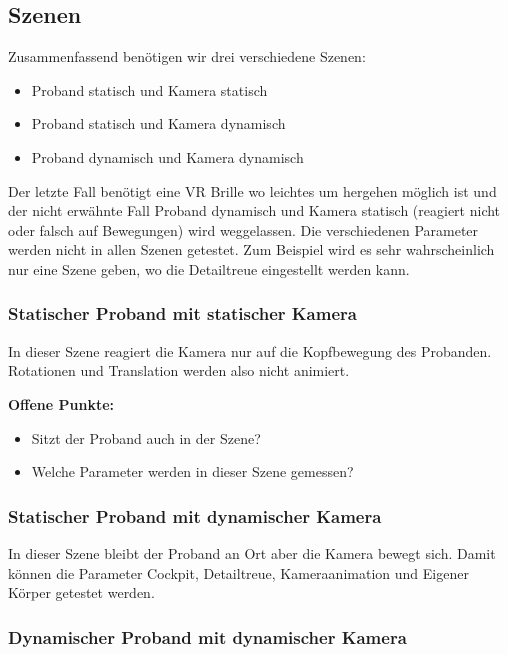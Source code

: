 \clearpage

\subsection{Szenen}


Zusammenfassend benötigen wir drei verschiedene Szenen:

\begin{itemize}
	\item Proband statisch und Kamera statisch
	\item Proband statisch und Kamera dynamisch
	\item Proband dynamisch und Kamera dynamisch
\end{itemize}

Der letzte Fall benötigt eine VR Brille wo leichtes um hergehen möglich ist und der nicht erwähnte Fall Proband dynamisch und Kamera statisch (reagiert nicht oder falsch auf Bewegungen) wird weggelassen.
Die verschiedenen Parameter werden nicht in allen Szenen getestet. Zum Beispiel wird es sehr wahrscheinlich nur eine Szene geben, wo die Detailtreue eingestellt werden kann.

\subsubsection{Statischer Proband mit statischer Kamera}
In dieser Szene reagiert die Kamera nur auf die Kopfbewegung des Probanden. Rotationen und Translation werden also nicht animiert.

\textbf{Offene Punkte:}
\begin{itemize}
\item Sitzt der Proband auch in der Szene?
\item Welche Parameter werden in dieser Szene gemessen?
\end{itemize}

\subsubsection{Statischer Proband mit dynamischer Kamera}

In dieser Szene bleibt der Proband an Ort aber die Kamera bewegt sich. Damit können die Parameter Cockpit, Detailtreue, Kameraanimation und Eigener Körper getestet werden.

\subsubsection{Dynamischer Proband mit dynamischer Kamera}

